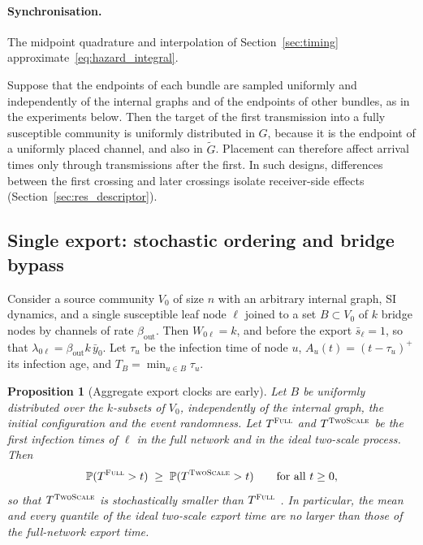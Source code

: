 \documentclass[a4paper,fleqn]{cas-sc}
\newtheorem{proposition}{Proposition}
\newcommand{\ibar}{\bar{y}}
\newcommand{\sbar}{\bar{s}}
\newcommand{\Full}{\textup{\textsc{Full}}}
\newcommand{\TS}{\textup{\textsc{TwoScale}}}
\begin{document}
\paragraph{Synchronisation.}
The midpoint quadrature and interpolation of Section~\ref{sec:timing} approximate~\eqref{eq:hazard_integral}.

\begin{remark}
\label{rem:placement}
Suppose that the endpoints of each bundle are sampled uniformly and independently of the internal graphs and of the endpoints of other bundles, as in the experiments below. Then the target of the first transmission into a fully susceptible community is uniformly distributed in $G$, because it is the endpoint of a uniformly placed channel, and also in $\tilde G$. Placement can therefore affect arrival times only through transmissions after the first. In such designs, differences between the first crossing and later crossings isolate receiver-side effects (Section~\ref{sec:res_descriptor}).
\end{remark}

\subsection{Single export: stochastic ordering and bridge bypass}
\label{sec:single_export}

Consider a source community $V_0$ of size $n$ with an arbitrary internal graph, SI dynamics, and a single susceptible leaf node $\ell$ joined to a set $B\subset V_0$ of $k$ bridge nodes by channels of rate $\beta_{\mathrm{out}}$. Then $W_{0\ell}=k$, and before the export $\sbar_\ell=1$, so that $\lambda_{0\ell}=\beta_{\mathrm{out}}k\,\ibar_0$. Let $\tau_u$ be the infection time of node $u$, $A_u(t)=(t-\tau_u)^+$ its infection age, and $T_B=\min_{u\in B}\tau_u$.

\begin{proposition}[Aggregate export clocks are early]
\label{prop:ordering}
Let $B$ be uniformly distributed over the $k$-subsets of $V_0$, independently of the internal graph, the initial configuration and the event randomness. Let $T^{\Full}$ and $T^{\TS}$ be the first infection times of $\ell$ in the full network and in the ideal two-scale process. Then
\[
\mathbb{P}(T^{\Full}>t)\;\ge\;\mathbb{P}(T^{\TS}>t)\qquad\text{for all }t\ge0,
\]
so that $T^{\TS}$ is stochastically smaller than $T^{\Full}$ \citep{shaked2007}. In particular, the mean and every quantile of the ideal two-scale export time are no larger than those of the full-network export time.
\end{proposition}
\end{document}
